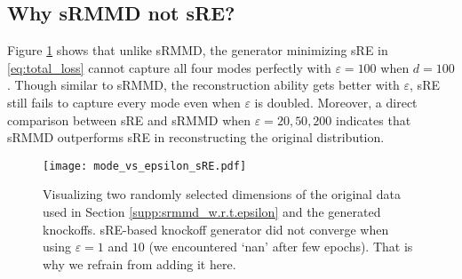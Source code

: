 \documentclass{article}
\theoremstyle{definition}
\begin{document}
\subsection{Why sRMMD not sRE?}\label{supp:srmmd_over_sre}
Figure \ref{fig:epsilon_check_sRE} shows that unlike sRMMD, the generator minimizing sRE in \eqref{eq:total_loss} cannot capture all four modes perfectly with $\varepsilon =100$ when $d = 100$. Though similar to sRMMD, the reconstruction ability gets better with $\varepsilon$, sRE still fails to capture every mode even when $\varepsilon$ is doubled. Moreover, a direct comparison between sRE and sRMMD when $\varepsilon = 20, 50, 200$ indicates that sRMMD outperforms sRE in reconstructing the original distribution. 
\begin{figure}[H]
    \centering
    \texttt{[image: mode\_vs\_epsilon\_sRE.pdf]}
    \caption{Visualizing two randomly selected dimensions of the original data used in Section \ref{supp:srmmd_w.r.t.epsilon} and the generated knockoffs. sRE-based knockoff generator did not converge when using $\varepsilon =1 $ and $10$ (we encountered `nan' after few epochs). That is why we refrain from adding it here.}
    \label{fig:epsilon_check_sRE}
\end{figure}
\end{document}
